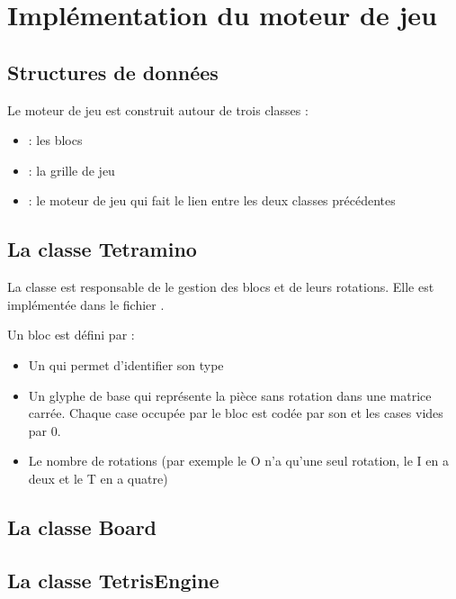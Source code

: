 \chapter{Implémentation du moteur de jeu}

\section{Structures de données}
Le moteur de jeu est construit autour de trois classes :
\begin{itemize}
	\item {} : les blocs 
	\item {} : la grille de jeu
	\item {} : le moteur de jeu qui fait le lien entre les deux classes précédentes
\end{itemize} 

\section{La classe Tetramino}
La classe  est responsable de le gestion des blocs et de leurs rotations. Elle est implémentée dans le fichier .

Un bloc est défini par :
\begin{itemize}
	\item Un  qui permet d'identifier son type
	\item Un glyphe de base qui représente la pièce sans rotation dans une matrice carrée. Chaque case occupée par le bloc est codée par son  et les cases vides par 0.
	\item Le nombre de rotations (par exemple le O n'a qu'une seul rotation, le I en a deux et le T en a quatre)
\end{itemize}



\section{La classe Board}

\section{La classe TetrisEngine}


